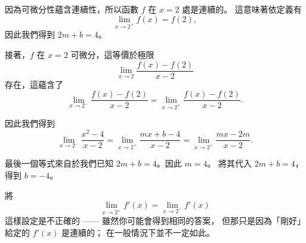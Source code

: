 \documentclass{article}
\begin{document}
\begin{reason}
	因為可微分性蘊含連續性，所以函數 $f$ 在 $x = 2$ 處是連續的。
	這意味著依定義有
	\[
	\lim_{x \to 2^+} f(x) = f(2),
	\]
	因此我們得到 $2m + b = 4$。

	接著，$f$ 在 $x = 2$ 可微分，這等價於極限
	\[
	\lim_{x \to 2} \frac{f(x) - f(2)}{x - 2}
	\]
	存在，這蘊含了
	\[
	\lim_{x \to 2^-} \frac{f(x) - f(2)}{x - 2}
	= \lim_{x \to 2^+} \frac{f(x) - f(2)}{x - 2}.
	\]

	因此我們得到
	\[
	\lim_{x \to 2^-} \frac{x^2 - 4}{x - 2}
	= \lim_{x \to 2^+} \frac{mx + b - 4}{x - 2}
	= \lim_{x \to 2^+} \frac{mx - 2m}{x - 2}.
	\]

	最後一個等式來自於我們已知 $2m + b = 4$。因此 $m = 4$。
	將其代入 $2m + b = 4$，得到 $b = -4$。
	\begin{note}
	將
	\[
	\lim_{x \to 2^+} f'(x) = \lim_{x \to 2^-} f'(x)
	\]
	這樣設定是不正確的 —— 雖然你可能會得到相同的答案，
	但那只是因為「剛好」給定的 $f'(x)$ 是連續的；
	在一般情況下並不一定如此。
	\end{note}

\end{reason}
\end{document}
